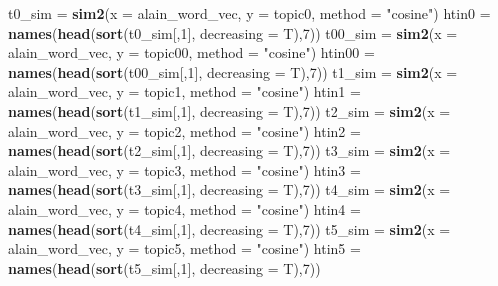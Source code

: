 \documentclass[
]{article}
\newenvironment{Shaded}{\begin{snugshade}}{\end{snugshade}}
\newcommand{\AttributeTok}[1]{\textcolor[rgb]{0.13,0.29,0.53}{#1}}
\newcommand{\DecValTok}[1]{\textcolor[rgb]{0.00,0.00,0.81}{#1}}
\newcommand{\FunctionTok}[1]{\textcolor[rgb]{0.13,0.29,0.53}{\textbf{#1}}}
\newcommand{\NormalTok}[1]{#1}
\newcommand{\OtherTok}[1]{\textcolor[rgb]{0.56,0.35,0.01}{#1}}
\newcommand{\StringTok}[1]{\textcolor[rgb]{0.31,0.60,0.02}{#1}}
\begin{document}
\begin{Shaded}
\begin{Highlighting}[]
\NormalTok{t0\_sim }\OtherTok{=} \FunctionTok{sim2}\NormalTok{(}\AttributeTok{x =}\NormalTok{ alain\_word\_vec, }\AttributeTok{y =}\NormalTok{ topic0, }\AttributeTok{method =} \StringTok{"cosine"}\NormalTok{)}
\NormalTok{htin0 }\OtherTok{=} \FunctionTok{names}\NormalTok{(}\FunctionTok{head}\NormalTok{(}\FunctionTok{sort}\NormalTok{(t0\_sim[,}\DecValTok{1}\NormalTok{], }\AttributeTok{decreasing =}\NormalTok{ T),}\DecValTok{7}\NormalTok{))}
\NormalTok{t00\_sim }\OtherTok{=} \FunctionTok{sim2}\NormalTok{(}\AttributeTok{x =}\NormalTok{ alain\_word\_vec, }\AttributeTok{y =}\NormalTok{ topic00, }\AttributeTok{method =} \StringTok{"cosine"}\NormalTok{)}
\NormalTok{htin00 }\OtherTok{=} \FunctionTok{names}\NormalTok{(}\FunctionTok{head}\NormalTok{(}\FunctionTok{sort}\NormalTok{(t00\_sim[,}\DecValTok{1}\NormalTok{], }\AttributeTok{decreasing =}\NormalTok{ T),}\DecValTok{7}\NormalTok{))}
\NormalTok{t1\_sim }\OtherTok{=} \FunctionTok{sim2}\NormalTok{(}\AttributeTok{x =}\NormalTok{ alain\_word\_vec, }\AttributeTok{y =}\NormalTok{ topic1, }\AttributeTok{method =} \StringTok{"cosine"}\NormalTok{)}
\NormalTok{htin1 }\OtherTok{=} \FunctionTok{names}\NormalTok{(}\FunctionTok{head}\NormalTok{(}\FunctionTok{sort}\NormalTok{(t1\_sim[,}\DecValTok{1}\NormalTok{], }\AttributeTok{decreasing =}\NormalTok{ T),}\DecValTok{7}\NormalTok{))}
\NormalTok{t2\_sim }\OtherTok{=} \FunctionTok{sim2}\NormalTok{(}\AttributeTok{x =}\NormalTok{ alain\_word\_vec, }\AttributeTok{y =}\NormalTok{ topic2, }\AttributeTok{method =} \StringTok{"cosine"}\NormalTok{)}
\NormalTok{htin2 }\OtherTok{=} \FunctionTok{names}\NormalTok{(}\FunctionTok{head}\NormalTok{(}\FunctionTok{sort}\NormalTok{(t2\_sim[,}\DecValTok{1}\NormalTok{], }\AttributeTok{decreasing =}\NormalTok{ T),}\DecValTok{7}\NormalTok{))}
\NormalTok{t3\_sim }\OtherTok{=} \FunctionTok{sim2}\NormalTok{(}\AttributeTok{x =}\NormalTok{ alain\_word\_vec, }\AttributeTok{y =}\NormalTok{ topic3, }\AttributeTok{method =} \StringTok{"cosine"}\NormalTok{)}
\NormalTok{htin3 }\OtherTok{=} \FunctionTok{names}\NormalTok{(}\FunctionTok{head}\NormalTok{(}\FunctionTok{sort}\NormalTok{(t3\_sim[,}\DecValTok{1}\NormalTok{], }\AttributeTok{decreasing =}\NormalTok{ T),}\DecValTok{7}\NormalTok{))}
\NormalTok{t4\_sim }\OtherTok{=} \FunctionTok{sim2}\NormalTok{(}\AttributeTok{x =}\NormalTok{ alain\_word\_vec, }\AttributeTok{y =}\NormalTok{ topic4, }\AttributeTok{method =} \StringTok{"cosine"}\NormalTok{)}
\NormalTok{htin4 }\OtherTok{=} \FunctionTok{names}\NormalTok{(}\FunctionTok{head}\NormalTok{(}\FunctionTok{sort}\NormalTok{(t4\_sim[,}\DecValTok{1}\NormalTok{], }\AttributeTok{decreasing =}\NormalTok{ T),}\DecValTok{7}\NormalTok{))}
\NormalTok{t5\_sim }\OtherTok{=} \FunctionTok{sim2}\NormalTok{(}\AttributeTok{x =}\NormalTok{ alain\_word\_vec, }\AttributeTok{y =}\NormalTok{ topic5, }\AttributeTok{method =} \StringTok{"cosine"}\NormalTok{)}
\NormalTok{htin5 }\OtherTok{=} \FunctionTok{names}\NormalTok{(}\FunctionTok{head}\NormalTok{(}\FunctionTok{sort}\NormalTok{(t5\_sim[,}\DecValTok{1}\NormalTok{], }\AttributeTok{decreasing =}\NormalTok{ T),}\DecValTok{7}\NormalTok{))}


\end{Highlighting}
\end{Shaded}
\end{document}
